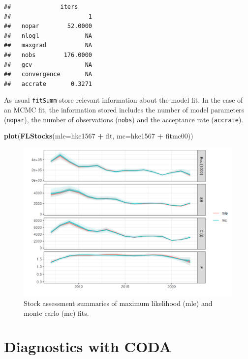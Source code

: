 \documentclass[
]{book}
\newenvironment{Shaded}{\begin{snugshade}}{\end{snugshade}}
\newcommand{\AttributeTok}[1]{\textcolor[rgb]{0.13,0.29,0.53}{#1}}
\newcommand{\FunctionTok}[1]{\textcolor[rgb]{0.13,0.29,0.53}{\textbf{#1}}}
\newcommand{\NormalTok}[1]{#1}
\newcommand{\SpecialCharTok}[1]{\textcolor[rgb]{0.81,0.36,0.00}{\textbf{#1}}}
\begin{document}
\begin{verbatim}
##              iters
##                      1
##   nopar        52.0000
##   nlogl             NA
##   maxgrad           NA
##   nobs        176.0000
##   gcv               NA
##   convergence       NA
##   accrate       0.3271
\end{verbatim}

As usual \texttt{fitSumm} store relevant information about the model fit. In the case of an MCMC fit, the information stored includes the number of model parameters (\texttt{nopar}), the number of observations (\texttt{nobs}) and the acceptance rate (\texttt{accrate}).

\begin{Shaded}
\begin{Highlighting}[]
\FunctionTok{plot}\NormalTok{(}\FunctionTok{FLStocks}\NormalTok{(}\AttributeTok{mle=}\NormalTok{hke1567 }\SpecialCharTok{+}\NormalTok{ fit, }\AttributeTok{mc=}\NormalTok{hke1567 }\SpecialCharTok{+}\NormalTok{ fitmc00))}
\end{Highlighting}
\end{Shaded}

\begin{figure}
\centering
\includegraphics{_bookdown_files/_main_files/figure-html/unnamed-chunk-88-1.png}
\caption{\label{fig:unnamed-chunk-88}Stock assessment summaries of maximum likelihood (mle) and monte carlo (mc) fits.}
\end{figure}

\hypertarget{diagnostics-with-coda}{%
\section{Diagnostics with CODA}\label{diagnostics-with-coda}}
\end{document}
